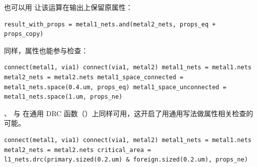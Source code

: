 也可以用  让该运算在输出上保留原属性：

\begin{lstlisting}
result_with_props = metal1_nets.and(metal2_nets, props_eq + props_copy)
\end{lstlisting}

同样，属性也能参与检查：

\begin{lstlisting}
connect(metal1, via1) connect(via1, metal2) metal1_nets = metal1.nets metal2_nets = metal2.nets metal1_space_connected = metal1_nets.space(0.4.um, props_eq) metal1_space_unconnected = metal1_nets.space(1.um, props_ne)
\end{lstlisting}

、 与  在通用 DRC 函数（）上同样可用，这开启了用通用写法做属性相关检查的可能。

\begin{lstlisting}
connect(metal1, via1) connect(via1, metal2) metal1_nets = metal1.nets metal2_nets = metal2.nets critical_area = l1_nets.drc(primary.sized(0.2.um) & foreign.sized(0.2.um), props_ne)
\end{lstlisting}
